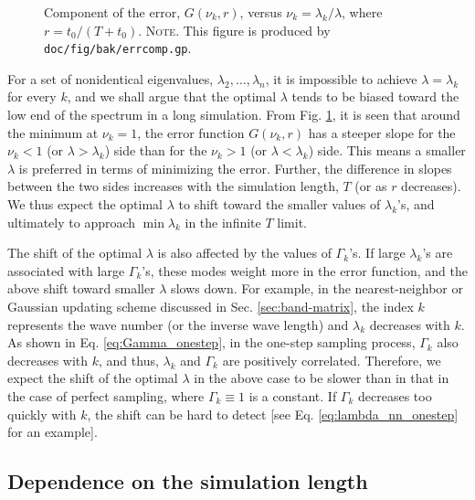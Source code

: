 \documentclass[preprint, floatfix]{revtex4-1}
\newcommand{\note}[1]{{\color{DarkGreen}\footnotesize \textsc{Note.} #1}}
\begin{document}
\begin{figure}[h]
\begin{center}
  \caption{
    \label{fig:err_component}
    Component of the error, $G(\nu_k, r)$,
    versus $\nu_k = \lambda_k / \lambda$,
    where $r = t_0 / (T + t_0)$.
    \note{This figure is produced by
      \texttt{doc/fig/bak/errcomp.gp}.
    }
  }
\end{center}
\end{figure}



For a set of nonidentical eigenvalues,
$\lambda_2, \dots, \lambda_n$,
it is impossible to achieve $\lambda = \lambda_k$
for every $k$,
and we shall argue that
the optimal $\lambda$
tends to be biased toward
the low end of the spectrum
in a long simulation.
%
From Fig. \ref{fig:err_component},
it is seen that around the minimum at $\nu_k = 1$,
the error function $G(\nu_k, r)$
has a steeper slope for the $\nu_k < 1$
(or $\lambda > \lambda_k$) side
than for the $\nu_k > 1$ (or $\lambda < \lambda_k$) side.
%
This means a smaller $\lambda$ is preferred
in terms of minimizing the error.
%
Further, the difference in slopes
between the two sides increases
with the simulation length, $T$
(or as $r$ decreases).
%
We thus expect the optimal $\lambda$
to shift toward the smaller values of $\lambda_k$'s,
and ultimately to approach $\min \lambda_k$
in the infinite $T$ limit.

The shift of the optimal $\lambda$
is also affected by the values of $\Gamma_k$'s.
%
If large $\lambda_k$'s are associated with
large $\Gamma_k$'s,
these modes weight more in the error function,
and the above shift toward smaller $\lambda$
slows down.
%
For example,
in the nearest-neighbor or Gaussian updating scheme
discussed in Sec. \ref{sec:band-matrix},
the index $k$ represents the wave number
(or the inverse wave length)
and $\lambda_k$ decreases with $k$.
%
As shown in Eq. \eqref{eq:Gamma_onestep},
in the one-step sampling process,
$\Gamma_k$ also decreases with $k$,
and thus, $\lambda_k$ and $\Gamma_k$
are positively correlated.
%
Therefore, we expect the shift of the optimal $\lambda$
in the above case
to be slower than in that in the case of perfect sampling,
where $\Gamma_k \equiv 1$ is a constant.
%
If $\Gamma_k$ decreases too quickly with $k$,
the shift can be hard to detect
[see Eq. \eqref{eq:lambda_nn_onestep} for an example].


\subsection{\label{sec:invt_deplength}
Dependence on the simulation length}
\end{document}
